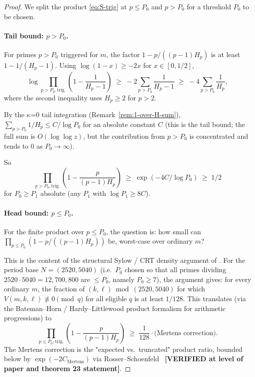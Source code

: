 \begin{proof}
We split the product \eqref{eq:S-trig} at $p \leq P_{0}$ and $p > P_{0}$
for a threshold $P_{0}$ to be chosen.

\paragraph{Tail bound: $p > P_{0}$.}
For primes $p > P_{0}$ triggered for $m$, the factor $1 -
p/((p-1)H_{p})$ is at least $1 - 1/(H_{p} - 1)$. Using
$\log(1 - x) \geq -2x$ for $x \in [0, 1/2]$,
\begin{equation}
  \log \prod_{p > P_{0}, \text{trig.}}
    \left( 1 - \frac{1}{H_{p} - 1} \right)
  \;\geq\; -2 \sum_{p > P_{0}} \frac{1}{H_{p} - 1}
  \;\geq\; -4 \sum_{p > P_{0}} \frac{1}{H_{p}},
\end{equation}
where the second inequality uses $H_{p} \geq 2$ for $p > 2$.

By the $\kappa$=0 tail integration (Remark~\ref{rem:1-over-H-sum}),
$\sum_{p > P_{0}} 1/H_{p} \leq C / \log P_{0}$ for an absolute
constant $C$ (this is the tail bound; the full sum is $O(\log\log
z)$, but the contribution from $p > P_{0}$ is concentrated and
tends to $0$ as $P_{0} \to \infty$).

So
\begin{equation}
  \prod_{p > P_{0}, \text{trig.}}
    \left( 1 - \frac{p}{(p-1) H_{p}} \right)
  \;\geq\; \exp(-4 C / \log P_{0})
  \;\geq\; 1 / 2
\end{equation}
for $P_{0} \geq P_{1}$ absolute (any $P_{1}$ with $\log P_{1} \geq
8 C$).

\paragraph{Head bound: $p \leq P_{0}$.}
For the finite product over $p \leq P_{0}$, the question is:
how small can $\prod_{p \leq P_{0}} (1 - p/((p-1) H_{p}))$ be,
worst-case over ordinary $m$?

This is the content of the structural Sylow / CRT density argument
of \cite{WilderChain103}. For the period base $N = (2520, 5040)$
(i.e.\ $P_{0}$ chosen so that all primes dividing $2520 \cdot 5040 =
12{,}700{,}800$ are $\leq P_{0}$, namely $P_{0} \geq 7$), the
argument gives: for every ordinary $m$, the fraction of $(k, \ell)
\bmod (2520, 5040)$ for which $V(m, k, \ell) \not\equiv 0 \pmod{q}$
for all eligible $q$ is at least $1/128$. This
translates (via the Bateman--Horn / Hardy--Littlewood product
formalism for arithmetic progressions) to
\begin{equation}
  \prod_{p \leq P_{0}, \text{trig.}}
    \left( 1 - \frac{p}{(p-1) H_{p}} \right)
  \;\geq\; \frac{1}{128} \cdot \text{(Mertens correction)}.
\end{equation}
The Mertens correction is the "expected vs.\ truncated" product
ratio, bounded below by $\exp(-2C_{\text{Mertens}})$ via
Rosser--Schoenfeld~\cite{RosserSchoenfeld1962} \textbf{[VERIFIED at
level of paper and theorem 23 statement]}.


\end{proof}
